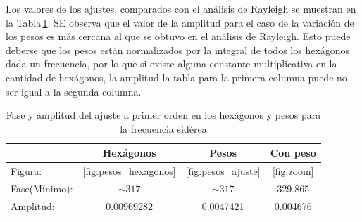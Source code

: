 Los valores de los ajustes, comparados con el análisis de Rayleigh se muestran en la Tabla\,\ref{tabla:ajuste_orden_cero}. SE observa que el valor de la amplitud para el caso de la variación de los pesos es más cercana al que se obtuvo en el análisis de Rayleigh. Esto puede deberse que los pesos están normalizados por la integral de todos los hexágonos dada un frecuencia, por lo que si existe alguna constante multiplicativa en la cantidad de hexágonos, la amplitud la tabla para la primera columna puede no ser igual a la segunda columna.

\begin{table}[H]
\centering
\begin{tabular}{l|c|c|c}
				& Hexágonos 				& Pesos						& Con peso \\ \hline
Figura:			& \ref{fig:pesos_hexagonos} &\ref{fig:pesos_ajuste}		&\ref{fig:zoom} \\
Fase(Mínimo):	& $\sim 317$ 				& $\sim 317$				&329.865	\\
Amplitud:		& 0.00969282 				& 0.0047421 				&0.004676\\
\end{tabular}
\caption{Fase y amplitud del ajuste a primer orden en los hexágonos y  pesos para la frecuencia sidérea}
\label{tabla:ajuste_orden_cero}
\end{table}
